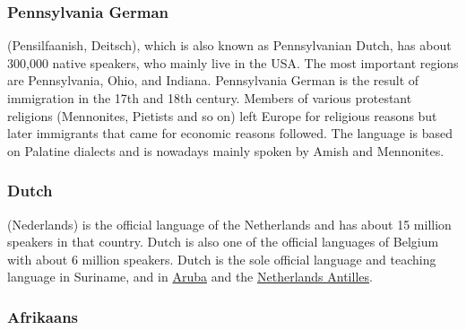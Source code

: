 \subsubsection{Pennsylvania German}

 (Pensilfaanish, Deitsch), which is also known as Pennsylvanian Dutch, has about 300,000
native speakers, who mainly live in the USA. The most important regions are Pennsylvania, Ohio, and
Indiana. Pennsylvania German is the result of immigration in the 17th and 18th century. Members of
various protestant religions (Mennonites, Pietists and so on) left Europe for religious reasons  
but later immigrants that came for economic reasons followed.  The language is
based on Palatine dialects and is nowadays mainly spoken by Amish and Mennonites.




\subsubsection{Dutch}

 (Nederlands) is the  official language of the Netherlands and has about 15 million speakers in that country. Dutch is also one of the official languages of Belgium with about 6 million speakers.
Dutch is the sole official language and teaching language in Suriname, 
and in \href{https://en.wikipedia.org/wiki/Aruba}{Aruba} and the \href{https://en.wikipedia.org/wiki/Netherlands_Antilles}{Netherlands Antilles}.


\subsubsection{Afrikaans}

